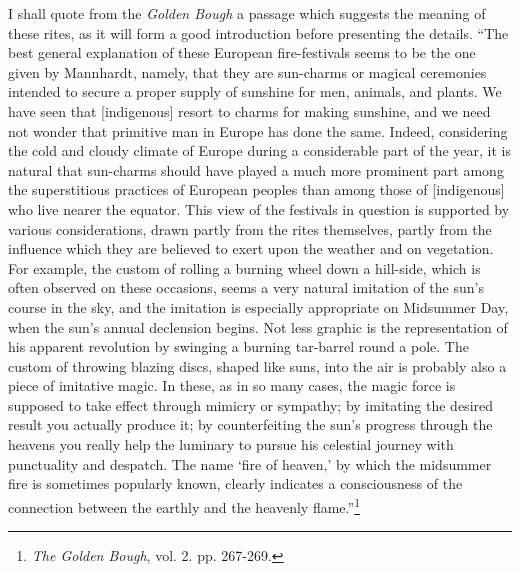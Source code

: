 \documentclass[a4paper, 11pt, oneside, polutonikogreek, english]{article}
\begin{document}
I shall quote from the \emph{Golden Bough} a passage which suggests the meaning of these rites, as it will form a good introduction before presenting the details. ``The best general explanation of these European fire-festivals seems to be the one given by Mannhardt, namely, that they are sun-charms or magical ceremonies intended to secure a proper supply of sunshine for men, animals, and plants. We have seen that [indigenous] resort to charms for making sunshine, and we need not wonder that primitive man in Europe has done the same. Indeed, considering the cold and cloudy climate of Europe during a considerable part of the year, it is natural that sun-charms should have played a much more prominent part among the superstitious practices of European peoples than among those of [indigenous] who live nearer the equator. This view of the festivals in question is supported by various considerations, drawn partly from the rites themselves, partly from the influence which they are believed to exert upon the weather and on vegetation. For example, the custom of rolling a burning wheel down a hill-side, which is often observed on these occasions, seems a very natural imitation of the sun's course in the sky, and the imitation is especially appropriate on Midsummer Day, when the sun's annual declension begins. Not less graphic is the representation of his apparent revolution by swinging a burning tar-barrel round a pole. The custom of throwing blazing discs, shaped like suns, into the air is probably also a piece of imitative magic. In these, as in so many cases, the magic force is supposed to take effect through mimicry or sympathy; by imitating the desired result you actually produce it; by counterfeiting the sun's progress through the heavens you really help the luminary to pursue his celestial journey with punctuality and despatch. The name `fire of heaven,' by which the midsummer fire is sometimes popularly known, clearly indicates a consciousness of the connection between the earthly and the heavenly flame.''\footnote{\emph{The Golden Bough}, vol. 2. pp. 267-269.}
\end{document}
